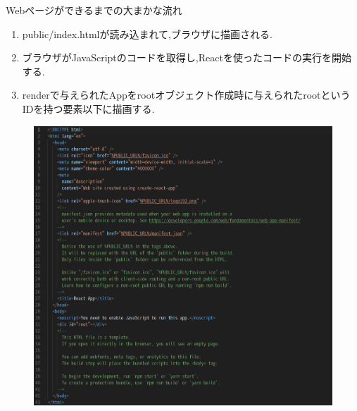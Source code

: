 \documentclass[aspectratio=169]{beamer}
\begin{document}
\begin{frame}[allowframebreaks]{Webページができるまでの大まかな流れ}
    \begin{enumerate}
        \item public/index.htmlが読み込まれて,ブラウザに描画される.
        \item ブラウザがJavaScriptのコードを取得し,Reactを使ったコードの実行を開始する.
        \item render\(\)で与えられたAppをrootオブジェクト作成時に与えられたrootというIDを持つ要素以下に描画する.
    \end{enumerate}
    \begin{figure}
        \centering
       \includegraphics[height=\paperheight]{index_html.png}
    \end{figure}
\end{frame}
\end{document}
